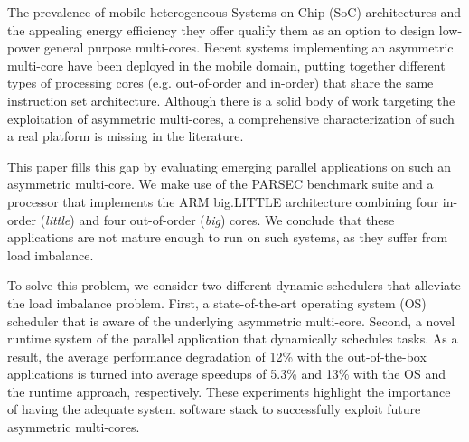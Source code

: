 The prevalence of mobile heterogeneous Systems on Chip (SoC) architectures and the appealing energy efficiency they offer qualify them as an option to design low-power general purpose multi-cores. Recent systems implementing an asymmetric multi-core have been deployed in the mobile domain, putting together different types of processing cores (e.g. out-of-order and in-order) that share the same instruction set architecture. Although there is a solid body of work targeting the exploitation of asymmetric multi-cores, a comprehensive characterization of such a real platform is missing in the literature. %

This paper fills this gap by evaluating emerging parallel applications on such an asymmetric multi-core. We make use of the PARSEC benchmark suite and a processor that implements the ARM big.LITTLE architecture combining four in-order (\emph{little}) and four out-of-order (\emph{big}) cores. We conclude that these applications are not mature enough to run on such systems, as they suffer from load imbalance. 

To solve this problem, we consider two different dynamic schedulers that alleviate the load imbalance problem. First, a state-of-the-art operating system (OS) scheduler that is aware of the underlying asymmetric multi-core. Second, a novel runtime system of the parallel application that dynamically schedules tasks. As a result, the average performance degradation of 12\% with the out-of-the-box applications is turned into average speedups of 5.3\% and 13\% with the OS and the runtime approach, respectively. These experiments highlight the importance of having the adequate system software stack to successfully exploit future asymmetric multi-cores.


